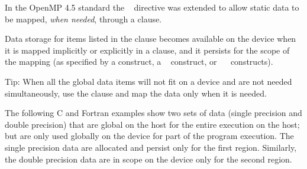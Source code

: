 In the OpenMP 4.5 standard the ~ directive was extended to allow static
data to be mapped, \emph{when needed}, through a  clause.

Data storage for items listed in the  clause becomes available on the device
when it is mapped implicitly or explicitly in a  clause, and it persists for the scope of
the mapping (as specified by a  construct, 
a ~ construct, or 
~~ constructs).

Tip: When all the global data items will not fit on a device and are not needed
simultaneously, use the  clause and map the data only when it is needed.

The following C and Fortran examples show two sets of data (single precision and double precision)
that are global on the host for the entire execution on the host; but are only used
globally on the device for part of the program execution. The single precision data
are allocated and persist only for the first  region. Similarly, the
double precision data are in scope on the device only for the second  region.


